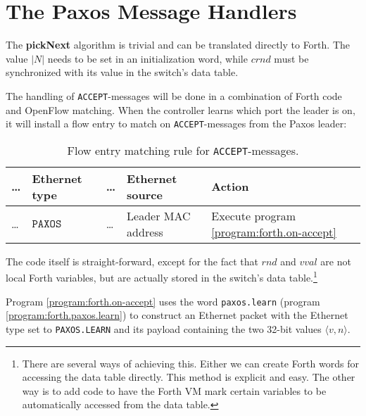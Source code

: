 
\section{The Paxos Message Handlers}

The \textbf{pickNext} algorithm is trivial and can be translated directly to
Forth.  The value $|N|$ needs to be set in an initialization word,
while $crnd$ must be synchronized with its value in the switch's data table.

The handling of \texttt{ACCEPT}-messages will be done in a combination of
Forth code and OpenFlow matching.  When the controller learns which port the
leader is on, it will install a flow entry to match on
\texttt{ACCEPT}-messages from the Paxos
leader:

\begin{table}[H]
  \centering
  \begin{tabular}{l|l|l|l|l|}
    \hline
      \dots &
      \textbf{Ethernet type} &
      \dots &
      \textbf{Ethernet source} &
      \textbf{Action}
      \\
    \hline
      \dots &
      $\texttt{PAXOS ACCEPT}$
      & \dots
      & Leader MAC address
      & Execute program \ref{program:forth.on-accept}
      \\
    \hline
  \end{tabular}
  \caption{Flow entry matching rule for \texttt{ACCEPT}-messages.}
  \label{table:matching.simple.accept}
\end{table}

The code itself is straight-forward, except for the fact that $rnd$ and
$vval$ are not local Forth variables, but are actually stored in the
switch's data table.\footnote{There are several ways of achieving this.
Either we can create Forth words for accessing the data table directly.
This method is explicit and easy.  The other way is to add code to have
the Forth VM mark certain variables to be automatically accessed from the
data table.}

Program \ref{program:forth.on-accept} 
uses the word \texttt{paxos.learn} (program \ref{program:forth.paxos.learn})
to construct an Ethernet packet with the
Ethernet type set to \texttt{PAXOS.LEARN} and its payload containing the two
32-bit values $\langle v, n \rangle$.

